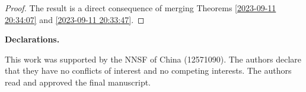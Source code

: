 \documentclass{amsart}
\theoremstyle{definition}
\theoremstyle{remark}
\numberwithin{equation}{section}
\begin{document}
\begin{proof}
The result is a direct consequence of merging Theorems \ref{2023-09-11 20:34:07} and \ref{2023-09-11 20:33:47}.
\end{proof}








\bigskip\bigskip
\bigskip\bigskip

\noindent\textbf{Declarations.}

\bigskip\bigskip

This work was supported by the NNSF of China (12571090).
 The authors declare that they have no conflicts of interest and no competing interests.  The authors read and approved the final manuscript.

\bigskip\bigskip
\end{document}
